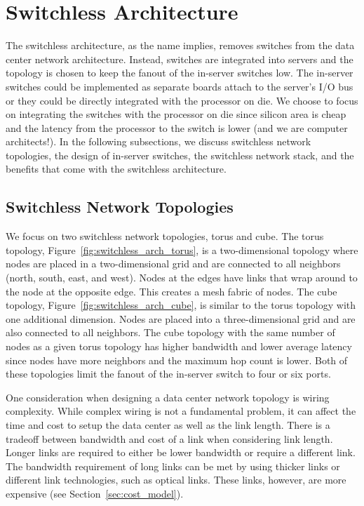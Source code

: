 \vspace{-0.1in}
\section{Switchless Architecture}
\label{sec:arch}

The switchless architecture, as the name implies, removes switches from the data center network architecture.  Instead, switches are integrated into servers and the topology is chosen to keep the fanout of the in-server switches low.  The in-server switches could be implemented as separate boards attach to the server's I/O bus or they could be directly integrated with the processor on die.  We choose to focus on integrating the switches with the processor on die since silicon area is cheap and the latency from the processor to the switch is lower (and we are computer architects!).  In the following subsections, we discuss switchless network topologies, the design of in-server switches, the switchless network stack, and the benefits that come with the switchless architecture.

\subsection{Switchless Network Topologies}

We focus on two switchless network topologies, torus and cube.  The torus topology, Figure~\ref{fig:switchless_arch_torus}, is a two-dimensional topology where nodes are placed in a two-dimensional grid and are connected to all neighbors (north, south, east, and west).  Nodes at the edges have links that wrap around to the node at the opposite edge.  This creates a mesh fabric of nodes.  The cube topology, Figure~\ref{fig:switchless_arch_cube}, is similar to the torus topology with one additional dimension.  Nodes are placed into a three-dimensional grid and are also connected to all neighbors.  The cube topology with the same number of nodes as a given torus topology has higher bandwidth and lower average latency since nodes have more neighbors and the maximum hop count is lower.  Both of these topologies limit the fanout of the in-server switch to four or six ports.

One consideration when designing a data center network topology is wiring complexity.  While complex wiring is not a fundamental problem, it can affect the time and cost to setup the data center as well as the link length.  There is a tradeoff between bandwidth and cost of a link when considering link length.  Longer links are required to either be lower bandwidth or require a different link.  The bandwidth requirement of long links can be met by using thicker links or different link technologies, such as optical links.  These links, however, are more expensive (see Section~\ref{sec:cost_model}).

